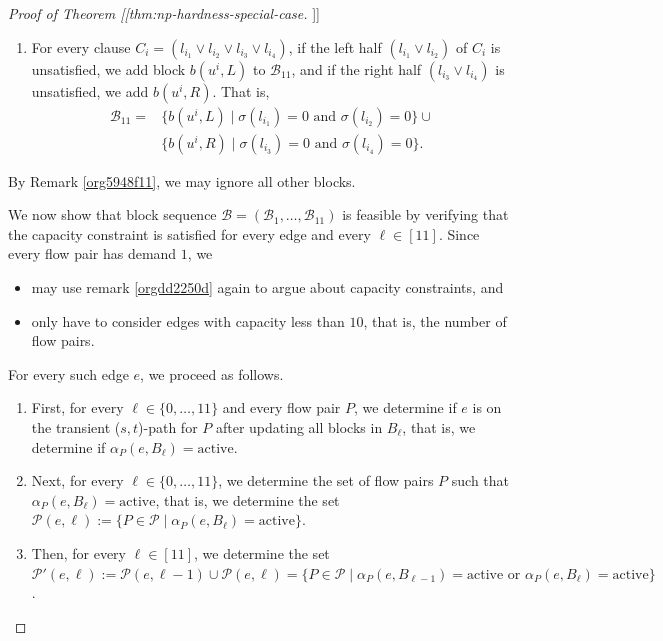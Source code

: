 \documentclass[fontsize=11pt,paper=a4]{book}
\begin{document}
\begin{proof}[Proof of Theorem [[thm:np-hardness-special-case]]]
\begin{enumerate}
\item For every clause \(C_i=(l_{i_1}\vee l_{i_2}\vee l_{i_3}\vee l_{i_4})\), if the left half \((l_{i_1}\vee l_{i_2})\) of \(C_i\) is unsatisfied, we add block \(b(u^i,L)\) to \(\mathscr{B}_{11}\), and if the right half \((l_{i_3}\vee l_{i_4})\) is unsatisfied, we add \(b(u^i,R)\).
That is,
\begin{align*}
\mathscr{B}_{11}=&\{b(u^i,L)\mid\sigma(l_{i_1})=0\text{ and }\sigma(l_{i_2})=0\}\cup\\
&\{b(u^i,R)\mid\sigma(l_{i_3})=0\text{ and }\sigma(l_{i_4})=0\}.
\end{align*}
\end{enumerate}

By Remark \ref{org5948f11}, we may ignore all other blocks.

We now show that block sequence \(\mathcal{B}=(\mathscr{B}_1,\dots,\mathscr{B}_{11})\) is feasible by verifying that the capacity constraint is satisfied for every edge and every \(\ell\in[11]\).
Since every flow pair has demand \(1\), we

\begin{itemize}
\item may use remark \ref{orgdd2250d} again to argue about capacity constraints, and

\item only have to consider edges with capacity less than \(10\), that is, the number of flow pairs.
\end{itemize}


For every such edge \(e\), we proceed as follows.

\begin{enumerate}
\item First, for every \(\ell\in\{0,\dots,11\}\) and every flow pair \(P\), we determine if \(e\) is on the transient (\(s,t\))-path for \(P\) after updating all blocks in \(B_{\ell}\), that is, we determine if \(\alpha_P(e,B_{\ell})=\mathrm{active}\).

\item Next, for every \(\ell\in\{0,\dots,11\}\), we determine the set of flow pairs \(P\) such that \(\alpha_P(e,B_{\ell})=\mathrm{active}\), that is, we determine the set \(\mathcal{P}(e,\ell):=\{P\in\mathcal{P}\mid\alpha_P(e,B_{\ell})=\mathrm{active}\}\).

\item Then, for every \(\ell\in[11]\), we determine the set \(\mathcal{P}'(e,\ell):=\mathcal{P}(e,\ell-1)\cup\mathcal{P}(e,\ell)=\{P\in\mathcal{P}\mid\alpha_P(e,B_{\ell-1})=\mathrm{active}\text{ or }\alpha_P(e,B_{\ell})=\mathrm{active}\}\).


\end{enumerate}
\end{proof}
\end{document}
